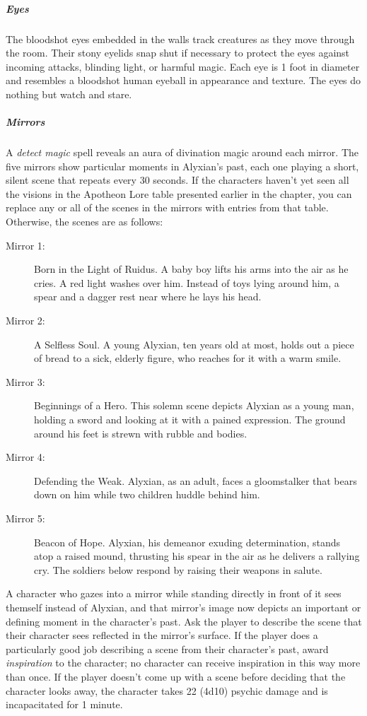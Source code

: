 \documentclass[10pt,a4paper,twoside,fancy,bg=print,twocolumn,openany,nodeprecatedcode]{dndbook}
\begin{document}
\subparagraph{Eyes}
The bloodshot eyes embedded in the walls track creatures as they move through the room. Their stony eyelids snap shut if necessary to protect the eyes against incoming attacks, blinding light, or harmful magic. Each eye is 1 foot in diameter and resembles a bloodshot human eyeball in appearance and texture. The eyes do nothing but watch and stare.

\subparagraph{Mirrors}
A \textit{detect magic} spell reveals an aura of divination magic around each mirror. The five mirrors show particular moments in Alyxian's past, each one playing a short, silent scene that repeats every 30 seconds. If the characters haven't yet seen all the visions in the Apotheon Lore table presented earlier in the chapter, you can replace any or all of the scenes in the mirrors with entries from that table. Otherwise, the scenes are as follows:


\begin{description}
\item[Mirror 1:]
Born in the Light of Ruidus. A baby boy lifts his arms into the air as he cries. A red light washes over him. Instead of toys lying around him, a spear and a dagger rest near where he lays his head.
\item[Mirror 2:]
A Selfless Soul. A young Alyxian, ten years old at most, holds out a piece of bread to a sick, elderly figure, who reaches for it with a warm smile.
\item[Mirror 3:]
Beginnings of a Hero. This solemn scene depicts Alyxian as a young man, holding a sword and looking at it with a pained expression. The ground around his feet is strewn with rubble and bodies.
\item[Mirror 4:]
Defending the Weak. Alyxian, as an adult, faces a gloomstalker that bears down on him while two children huddle behind him.
\item[Mirror 5:]
Beacon of Hope. Alyxian, his demeanor exuding determination, stands atop a raised mound, thrusting his spear in the air as he delivers a rallying cry. The soldiers below respond by raising their weapons in salute.
\end{description}

A character who gazes into a mirror while standing directly in front of it sees themself instead of Alyxian, and that mirror's image now depicts an important or defining moment in the character's past. Ask the player to describe the scene that their character sees reflected in the mirror's surface. If the player does a particularly good job describing a scene from their character's past, award \textit{inspiration} to the character; no character can receive inspiration in this way more than once. If the player doesn't come up with a scene before deciding that the character looks away, the character takes 22 (4d10) psychic damage and is incapacitated for 1 minute.
\end{document}
